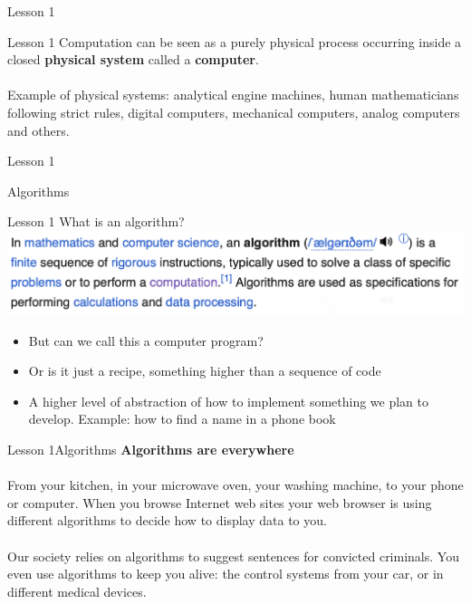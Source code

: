 \documentclass[aspectratio=1610]{beamer}
\begin{document}
\begin{frame}{Lesson 1}{}
\end{frame}


\begin{frame}{Lesson 1}{}
\Large
Computation can be seen as a purely physical process occurring inside a closed \textbf{physical system} called a \textbf{computer}.\\~\\ 
Example of physical systems: analytical engine machines, human mathematicians following strict rules, digital computers, mechanical computers, analog computers and others.
\end{frame}


\begin{frame}{Lesson 1}{}
\begin{center}
\Huge Algorithms
\end{center}
\end{frame}

\begin{frame}{Lesson 1}{}
{\Huge{What is an algorithm?}}
\includegraphics[scale=0.33]{Images/algorithm.png}

\Large{
\begin{itemize}
    \item But can we call this a \alert{computer program}?
    \item Or is it just a recipe, something higher than a \alert{sequence of code}
    \item A higher level of abstraction of how to implement something we plan to develop. Example: how to find a name in a phone book
\end{itemize}}

\end{frame}

\begin{frame}{Lesson 1}{Algorithms}
\Large
\textbf{Algorithms are everywhere}\\~\\ 
From your kitchen, in your microwave oven, your washing machine, to your phone or computer. When you browse Internet web sites your web browser is using different algorithms to decide how to display data to you.\\~\\
Our society relies on algorithms to suggest sentences for convicted criminals. You even use algorithms to keep you alive: the control systems from your car, or in different medical devices.
\end{frame}
\end{document}
